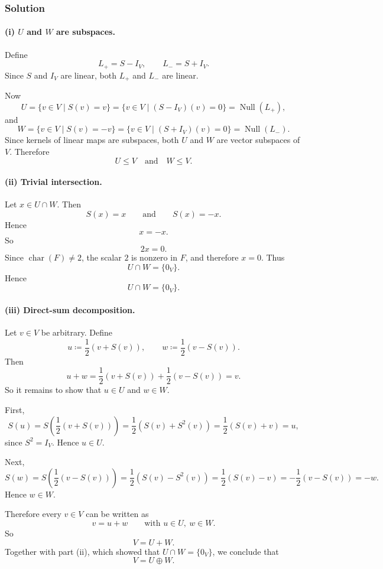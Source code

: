 \documentclass[12pt]{article}
\DeclareMathOperator{\Null}{Null}
\begin{document}
\subsubsection{Solution}

\paragraph{(i) \(U\) and \(W\) are subspaces.}
Define
\[
L_+=S-I_V,\qquad L_-=S+I_V.
\]
Since \(S\) and \(I_V\) are linear, both \(L_+\) and \(L_-\) are linear.

Now
\[
U=\{v\in V\mid S(v)=v\}=\{v\in V\mid (S-I_V)(v)=0\}=\Null(L_+),
\]
and
\[
W=\{v\in V\mid S(v)=-v\}=\{v\in V\mid (S+I_V)(v)=0\}=\Null(L_-).
\]
Since kernels of linear maps are subspaces, both \(U\) and \(W\) are vector subspaces of \(V\). Therefore
\[
\boxed{U\le V\quad\text{and}\quad W\le V.}
\]

\paragraph{(ii) Trivial intersection.}
Let \(x\in U\cap W\). Then
\[
S(x)=x
\qquad\text{and}\qquad
S(x)=-x.
\]
Hence
\[
x=-x.
\]
So
\[
2x=0.
\]
Since \(\operatorname{char}(F)\neq 2\), the scalar \(2\) is nonzero in \(F\), and therefore \(x=0\). Thus
\[
U\cap W=\{0_V\}.
\]
Hence
\[
\boxed{U\cap W=\{0_V\}.}
\]

\paragraph{(iii) Direct-sum decomposition.}
Let \(v\in V\) be arbitrary. Define
\[
u\coloneqq \frac12(v+S(v)),
\qquad
w\coloneqq \frac12(v-S(v)).
\]
Then
\[
u+w
=
\frac12(v+S(v))+\frac12(v-S(v))
=
v.
\]
So it remains to show that \(u\in U\) and \(w\in W\).

First,
\[
S(u)
=
S\left(\frac12(v+S(v))\right)
=
\frac12(S(v)+S^2(v))
=
\frac12(S(v)+v)
=
u,
\]
since \(S^2=I_V\). Hence \(u\in U\).

Next,
\[
S(w)
=
S\left(\frac12(v-S(v))\right)
=
\frac12(S(v)-S^2(v))
=
\frac12(S(v)-v)
=
-\frac12(v-S(v))
=
-w.
\]
Hence \(w\in W\).

Therefore every \(v\in V\) can be written as
\[
v=u+w
\qquad\text{with }u\in U,\ w\in W.
\]
So
\[
V=U+W.
\]
Together with part (ii), which showed that \(U\cap W=\{0_V\}\), we conclude that
\[
\boxed{V=U\oplus W.}
\]

\newpage

\end{document}
